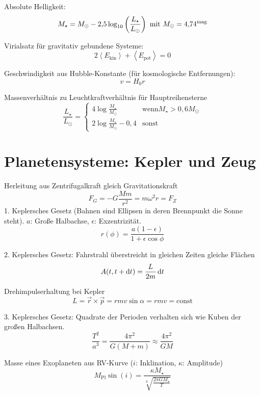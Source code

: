 \documentclass[a4paper,german,12pt,smallheadings]{scrartcl}
\begin{document}
Absolute Helligkeit:
\begin{equation}
  M_\star = M_\odot - 2{,}5 \log_{10} \del{\frac{L_\star}{L_\odot}} \text{ mit } M_\odot = 4{,}74^\text{mag}
\end{equation}

Virialsatz für gravitativ gebundene Systeme:
\begin{equation}
  2 \left<E_\text{kin}\right> + \left<E_\text{pot}\right> = 0
\end{equation}

Geschwindigkeit aus Hubble-Konstante (für kosmologische Entfernungen):
\begin{equation}
  v = H_0 r
\end{equation}

Massenverhältnis zu Leuchtkraftverhältnis für Hauptreihensterne
\begin{equation}
  \frac{L_\star}{L_\odot} = \begin{cases}
    4 \log \frac{M_\star}{M_\odot} & \text{wenn} M_\star > 0{,}6 M_\odot \\
    2 \log \frac{M_\star}{M_\odot} - 0{,}4 & \text{sonst}
  \end{cases}
\end{equation}

\section*{Planetensysteme: Kepler und Zeug}
Herleitung aus Zentrifugalkraft gleich Gravitationskraft
\begin{equation}
  F_G = - G \frac{Mm}{r^2} = m \omega^2 r = F_Z
\end{equation}
1. Keplersches Gesetz (Bahnen sind Ellipsen in deren Brennpunkt die Sonne steht). $a$: Große Halbachse, $\epsilon$: Exzentrizität.
\begin{equation}
  r(\phi) = \frac{a(1-\epsilon)}{1 + \epsilon \cos \phi}
\end{equation}

2. Keplersches Gesetz: Fahrstrahl überstreicht in gleichen Zeiten gleiche
Flächen
\begin{equation}
  A(t, t + \dif t) = \frac{L}{2m} \dif t
\end{equation}

Drehimpulserhaltung bei Kepler
\begin{equation}
  L = \vec{r} \times \vec{p} = r m v \sin \alpha = r m v = \text{const}
\end{equation}

3. Keplersches Gesetz: Quadrate der Perioden verhalten sich wie Kuben der
großen Halbachsen.
\begin{equation}
  \frac{T^2}{a^3} = \frac{4 \pi^2}{G(M+m)} \approx \frac{4 \pi^2}{GM}
\end{equation}

Masse eines Exoplaneten aus RV-Kurve ($i$: Inklination, $\kappa$: Amplitude)
\begin{equation}
  M_\text{Pl} \sin(i) = \frac{\kappa M_\star}{\sqrt[3]{\frac{2 \pi G M_\star}{T}}}
\end{equation}
\end{document}
